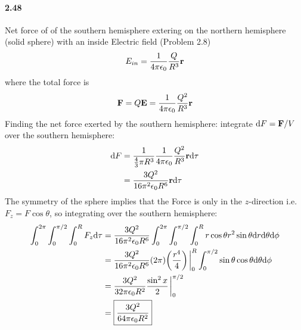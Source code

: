 \documentclass[../main.tex]{subfiles}
\begin{document}
\paragraph{2.48} Net force of of the southern hemisphere extering on the northern hemisphere (solid sphere) with an inside Electric field (Problem 2.8)
\begin{align*}
    E_{in} = \frac{1}{4\pi\epsilon_0} \frac{Q}{R^3} \vb r 
\end{align*}
where the total force is 
\begin{align*}
    \vb F = Q \vb E = \frac{1}{4\pi\epsilon_0} \frac{Q^2}{R^3} \vb r
\end{align*}
Finding the net force exerted by the southern hemisphere: integrate $\dd F = \vb F / V$ over the southern hemisphere:
\begin{align*}
    \dd F &= \frac{1}{\frac{4}{3} \pi R^3} \frac{1}{4\pi\epsilon_0} \frac{Q^2}{R^3} \vb r \dd \tau \\
    &= \frac{3Q^2}{16\pi^2 \epsilon_0 R^6} \vb r \dd \tau
\end{align*}
The symmetry of the sphere implies that the Force is only in the $z$-direction i.e. $F_z = F \cos\theta$, so integrating over the southern hemisphere:
\begin{align*}
    \int_0^{2\pi} \int_0^{\pi/2} \int_0^R F_z \dd \tau &= \frac{3Q^2}{16\pi^2 \epsilon_0 R^6} \int_0^{2\pi} \int_0^{\pi/2} \int_0^R r \cos\theta r^2 \sin \theta \dd r \dd \theta \dd \phi \\
    &= \frac{3Q^2}{16\pi^2 \epsilon_0 R^6} (2\pi) \qt(\frac{r^4}{4})\eval_0^R \int_0^{\pi/2} \sin\theta \cos\theta \dd \theta \dd \phi \\
    &= \frac{3Q^2}{32\pi \epsilon_0 R^2} \frac{\sin^2 x}{2} \eval_0^{\pi/2} \\
    &= \boxed{\frac{3Q^2}{64\pi \epsilon_0 R^2}}
\end{align*}
\end{document}
